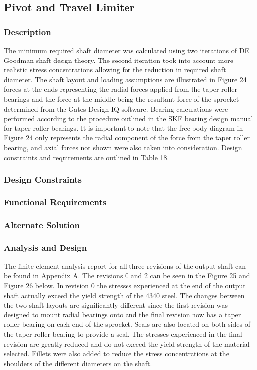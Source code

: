 \subsection{Pivot and Travel Limiter}
\subsubsection{Description}

The minimum required shaft diameter was calculated using two iterations of DE Goodman shaft design theory. The second iteration took into account more realistic stress concentrations allowing for the reduction in required shaft diameter. The shaft layout and loading assumptions are illustrated in Figure 24 forces at the ends representing the radial forces applied from the taper roller bearings and the force at the middle being the resultant force of the sprocket determined from the Gates Design IQ software. Bearing calculations were performed according to the procedure outlined in the SKF bearing design manual for taper roller bearings. It is important to note that the free body diagram in Figure 24 only represents the radial component of the force from the taper roller bearing, and axial forces not shown were also taken into consideration. Design constraints and requirements are outlined in Table 18.  

\subsubsection{Design Constraints}

\subsubsection{Functional Requirements}

\subsubsection{Alternate Solution}

\subsubsection{Analysis and Design}

The finite element analysis report for all three revisions of the output shaft can be found in Appendix A.  The revisions 0 and 2 can be seen in the Figure 25 and Figure 26 below. In revision 0 the stresses experienced at the end of the output shaft actually exceed the yield strength of the 4340 steel. The changes between the two shaft layouts are significantly different since the first revision was designed to mount radial bearings onto and the final revision now has a taper roller bearing on each end of the sprocket. Seals are also located on both sides of the taper roller bearing to provide a seal. The stresses experienced in the final revision are greatly reduced and do not exceed the yield strength of the material selected. Fillets were also added to reduce the stress concentrations at the shoulders of the different diameters on the shaft.
